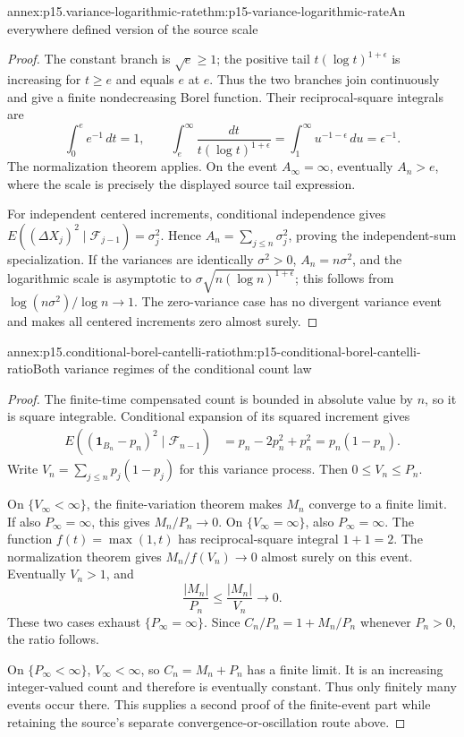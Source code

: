\begin{annexitem}{annex:p15.variance-logarithmic-rate}{thm:p15-variance-logarithmic-rate}{An everywhere defined version of the source scale}
\begin{proof}
The constant branch is \(\sqrt e\geq1\); the positive tail
\(t(\log t)^{1+\epsilon}\) is increasing for \(t\geq e\)
and equals \(e\) at \(e\). Thus the two branches join
continuously and give a finite nondecreasing Borel function.
Their reciprocal-square integrals are
\[
 \int_0^e e^{-1}\,dt=1,\qquad
 \int_e^\infty\frac{dt}{t(\log t)^{1+\epsilon}}
        =\int_1^\infty u^{-1-\epsilon}\,du=\epsilon^{-1}.
\]
The normalization theorem applies.
On the event \(A_\infty=\infty\), eventually \(A_n>e\),
where the scale is precisely the displayed source tail expression.

For independent centered increments, conditional independence gives
\(E((\Delta X_j)^2\mid\mathcal F_{j-1})=\sigma_j^2\).
Hence \(A_n=\sum_{j\leq n}\sigma_j^2\), proving the independent-sum
specialization. If the variances are identically \(\sigma^2>0\),
\(A_n=n\sigma^2\), and the logarithmic scale is asymptotic to
\(\sigma\sqrt{n(\log n)^{1+\epsilon}}\); this follows from
\(\log(n\sigma^2)/\log n\to1\).
The zero-variance case has no divergent variance event and makes
all centered increments zero almost surely.
\end{proof}
\end{annexitem}

\begin{annexitem}{annex:p15.conditional-borel-cantelli-ratio}{thm:p15-conditional-borel-cantelli-ratio}{Both variance regimes of the conditional count law}
\begin{proof}
The finite-time compensated count is bounded in absolute value by \(n\),
so it is square integrable. Conditional expansion of its squared
increment gives
\[
 \begin{aligned}
 E((\mathbf1_{B_n}-p_n)^2\mid\mathcal F_{n-1})
       &=p_n-2p_n^2+p_n^2=p_n(1-p_n).
 \end{aligned}
\]
Write \(V_n=\sum_{j\leq n}p_j(1-p_j)\) for this variance process.
Then \(0\leq V_n\leq P_n\).

On \(\{V_\infty<\infty\}\), the finite-variation theorem makes
\(M_n\) converge to a finite limit. If also \(P_\infty=\infty\),
this gives \(M_n/P_n\to0\).
On \(\{V_\infty=\infty\}\), also \(P_\infty=\infty\).
The function \(f(t)=\max(1,t)\) has reciprocal-square integral
\(1+1=2\). The normalization theorem gives
\(M_n/f(V_n)\to0\) almost surely on this event.
Eventually \(V_n>1\), and
\[
                        \frac{|M_n|}{P_n}\leq\frac{|M_n|}{V_n}\longrightarrow0.
\]
These two cases exhaust \(\{P_\infty=\infty\}\).
Since \(C_n/P_n=1+M_n/P_n\) whenever \(P_n>0\), the ratio follows.

On \(\{P_\infty<\infty\}\), \(V_\infty<\infty\), so
\(C_n=M_n+P_n\) has a finite limit. It is an increasing
integer-valued count and therefore is eventually constant.
Thus only finitely many events occur there.
This supplies a second proof of the finite-event part while
retaining the source's separate convergence-or-oscillation route above.
\end{proof}
\end{annexitem}

